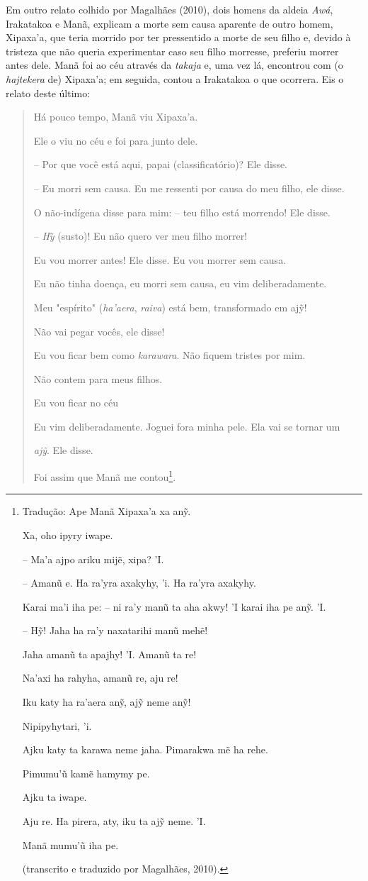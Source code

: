 Em outro relato colhido por Magalhães (2010), dois homens da aldeia
\emph{Awá}, Irakatakoa e Manã, explicam a morte sem causa aparente de
outro homem, Xipaxa'a, que teria morrido por ter pressentido a morte de
seu filho e, devido à tristeza que não queria experimentar caso seu
filho morresse, preferiu morrer antes dele. Manã foi ao céu através da
\emph{takaja} e, uma vez lá, encontrou com (o \emph{hajtekera} de)
Xipaxa'a; em seguida, contou a Irakatakoa o que ocorrera. Eis o relato
deste último:

\begin{quote}
Há pouco tempo, Manã viu Xipaxa'a.

Ele o viu no céu e foi para junto dele.

-- Por que você está aqui, papai (classificatório)? Ele disse.

-- Eu morri sem causa. Eu me ressenti por causa do meu filho, ele disse.

O não-indígena disse para mim: -- teu filho está morrendo! Ele disse.

-- \emph{Hy}̃ (susto)! Eu não quero ver meu filho morrer!

Eu vou morrer antes! Ele disse. Eu vou morrer sem causa.

Eu não tinha doença, eu morri sem causa, eu vim deliberadamente.

Meu "espírito" (\emph{ha'aera}, \emph{raiva}) está bem, transformado em
ajỹ!

Não vai pegar vocês, ele disse!

Eu vou ficar bem como \emph{karawara}. Não fiquem tristes por mim.

Não contem para meus filhos.

Eu vou ficar no céu

Eu vim deliberadamente. Joguei fora minha pele. Ela vai se tornar um

\emph{ajỹ}. Ele disse.

Foi assim que Manã me contou\footnote{Tradução: Ape Manã Xipaxa'a xa
  anỹ.

  Xa, oho ipyry iwape.

  -- Ma'a ajpo ariku mijẽ, xipa? 'I.

  -- Amanũ e. Ha ra'yra axakyhy, 'i. Ha ra'yra axakyhy.

  Karai ma'i iha pe: -- ni ra'y manũ ta aha akwy! 'I karai iha pe anỹ.
  'I.

  -- Hỹ! Jaha ha ra'y naxatarihi manũ mehẽ!

  Jaha amanũ ta apajhy! 'I. Amanũ ta re!

  Na'axi ha rahyha, amanũ re, aju re!

  Iku katy ha ra'aera anỹ, ajỹ neme anỹ!

  Nipipyhytari, 'i.

  Ajku katy ta karawa neme jaha. Pimarakwa mẽ ha rehe.

  Pimumu'ũ kamẽ hamymy pe.

  Ajku ta iwape.

  Aju re. Ha pirera, aty, iku ta ajỹ neme. 'I.

  Manã mumu'ũ iha pe.

  (transcrito e traduzido por Magalhães, 2010).}.
\end{quote}

